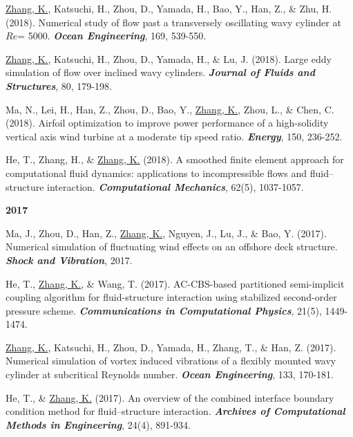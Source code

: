 \documentclass[10pt]{article}
\begin{document}
{\begin{etaremune}
  \item \underline{Zhang, K.}, Katsuchi, H., Zhou, D., Yamada, H., Bao, Y., Han, Z., \& Zhu, H. (2018). Numerical study of flow past a transversely oscillating wavy cylinder at $Re$= 5000. \textit{\textbf{Ocean Engineering}}, 169, 539-550.
  
  \item \underline{Zhang, K.}, Katsuchi, H., Zhou, D., Yamada, H., \& Lu, J. (2018). Large eddy simulation of flow over inclined wavy cylinders. \textit{\textbf{Journal of Fluids and Structures}}, 80, 179-198.
  
  \item Ma, N., Lei, H., Han, Z., Zhou, D., Bao, Y., \underline{Zhang, K.}, Zhou, L., \& Chen, C. (2018). Airfoil optimization to improve power performance of a high-solidity vertical axis wind turbine at a moderate tip speed ratio. \textit{\textbf{Energy}}, 150, 236-252.
  
  \item He, T., Zhang, H., \& \underline{Zhang, K.} (2018). A smoothed finite element approach for computational fluid dynamics: applications to incompressible flows and fluid–structure interaction. \textit{\textbf{Computational Mechanics}}, 62(5), 1037-1057.
 \item [] {\bf \color{Blue} 2017}   
  \item Ma, J., Zhou, D., Han, Z., \underline{Zhang, K.}, Nguyen, J., Lu, J., \& Bao, Y. (2017). Numerical simulation of fluctuating wind effects on an offshore deck structure. \textit{\textbf{Shock and Vibration}}, 2017.
  
  \item He, T., \underline{Zhang, K.}, \& Wang, T. (2017). AC-CBS-based partitioned semi-implicit coupling algorithm for fluid-structure interaction using stabilized second-order pressure scheme. \textit{\textbf{Communications in Computational Physics}}, 21(5), 1449-1474.
  
  \item \underline{Zhang, K.}, Katsuchi, H., Zhou, D., Yamada, H., Zhang, T., \& Han, Z. (2017). Numerical simulation of vortex induced vibrations of a flexibly mounted wavy cylinder at subcritical Reynolds number. \textit{\textbf{Ocean Engineering}}, 133, 170-181.
  
  \item He, T., \& \underline{Zhang, K.} (2017). An overview of the combined interface boundary condition method for fluid–structure interaction. \textit{\textbf{Archives of Computational Methods in Engineering}}, 24(4), 891-934.
  

\end{etaremune}}
\end{document}
